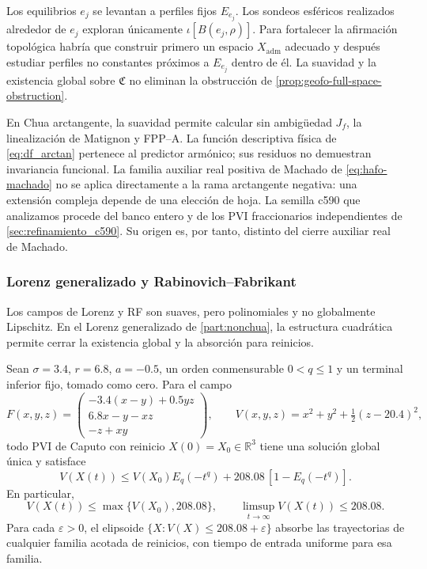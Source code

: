 Los equilibrios \(e_j\) se levantan a perfiles fijos \(E_{e_j}\). Los sondeos
esféricos realizados alrededor de \(e_j\) exploran únicamente
\(\iota[B(e_j,\rho)]\). Para fortalecer la afirmación topológica habría que
construir primero un espacio \(X_{\mathrm{adm}}\) adecuado y después
estudiar perfiles no constantes próximos a \(E_{e_j}\) dentro de él.
La suavidad y la existencia global sobre \(\mathfrak C\) no eliminan
la obstrucción de \cref{prop:geofo-full-space-obstruction}.

En Chua arctangente, la suavidad permite calcular sin ambigüedad \(J_f\), la
linealización de Matignon y FPP--A. La función descriptiva física de
\cref{eq:df_arctan} pertenece al predictor armónico; sus residuos no demuestran
invariancia funcional. La familia auxiliar real positiva de Machado de
\cref{eq:hafo-machado} no se aplica directamente a la rama arctangente negativa:
una extensión compleja depende de una elección de hoja. La semilla c590
que analizamos procede del banco entero y de los PVI fraccionarios
independientes de \cref{sec:refinamiento_c590}. Su origen es, por tanto,
distinto del cierre auxiliar real de Machado.

\subsubsection{Lorenz generalizado y Rabinovich--Fabrikant}

Los campos de Lorenz y RF son suaves, pero polinomiales y no globalmente
Lipschitz. En el Lorenz generalizado de \cref{part:nonchua}, la estructura
cuadrática permite cerrar la existencia global y la absorción para reinicios.

\begin{proposition}
\label{prop:geofo-lorenz-boundedness}
Sean \(\sigma=3.4\), \(r=6.8\), \(a=-0.5\), un orden conmensurable
\(0<q\leq1\) y un terminal inferior fijo, tomado como cero. Para el campo
\begin{equation}
 F(x,y,z)=\begin{pmatrix}
 -3.4(x-y)+0.5yz\\
 6.8x-y-xz\\
 -z+xy
 \end{pmatrix},
 \qquad
 V(x,y,z)=x^2+y^2+\tfrac12(z-20.4)^2,
 \label{eq:geofo-lorenz-lyapunov}
\end{equation}
todo PVI de Caputo con reinicio \(X(0)=X_0\in\mathbb R^3\) tiene una
solución global única y satisface
\begin{equation}
 V(X(t))\leq V(X_0)E_q(-t^q)
       +208.08\,[1-E_q(-t^q)].
 \label{eq:geofo-lorenz-comparison}
\end{equation}
En particular,
\begin{equation}
 V(X(t))\leq\max\{V(X_0),208.08\},
 \qquad \limsup_{t\to\infty}V(X(t))\leq208.08.
 \label{eq:geofo-lorenz-ultimate-bound}
\end{equation}
Para cada \(\varepsilon>0\), el elipsoide
\(\{X:V(X)\leq208.08+\varepsilon\}\) absorbe las trayectorias de
cualquier familia acotada de reinicios, con tiempo de entrada uniforme
para esa familia.
\end{proposition}

